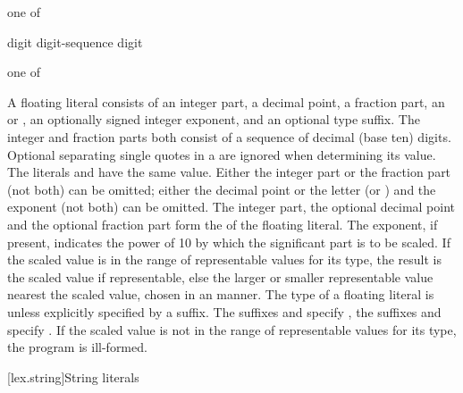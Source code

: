 \begin{bnf}
 \textnormal{one of}\br
    \terminal{+  -}
\end{bnf}

\begin{bnf}
\br
    digit\br
    digit-sequence \opt digit
\end{bnf}

\begin{bnf}
 \textnormal{one of}\br
\end{bnf}

\pnum
{}%
A floating literal consists of an integer part, a decimal point, a
fraction part, an
%
%
 or , an optionally signed integer exponent, and an
optional type suffix. The integer and fraction parts both consist of a
sequence of decimal (base ten) digits. Optional separating single quotes in a
 are ignored when determining its value.
\enterexample The literals  and 
have the same value. \exitexample
Either the integer part or the
fraction part (not both) can be omitted; either the decimal point or the
letter  (or  ) and the exponent (not both) can be
omitted. The integer part, the optional decimal point and the optional
fraction part form the  of the
floating literal. The exponent, if present, indicates the power of 10 by
which the significant part is to be scaled. If the scaled value is in
the range of representable values for its type, the result is the scaled
value if representable, else the larger or smaller representable value
nearest the scaled value, chosen in an  manner.
%
The type of a floating literal is 
%
unless explicitly specified by a suffix.
%
%
%
The suffixes  and  specify ,
%
%
%
the suffixes  and  specify 
. If the scaled value is not in the range of representable
values for its type, the program is ill-formed.

[lex.string]{String literals}

